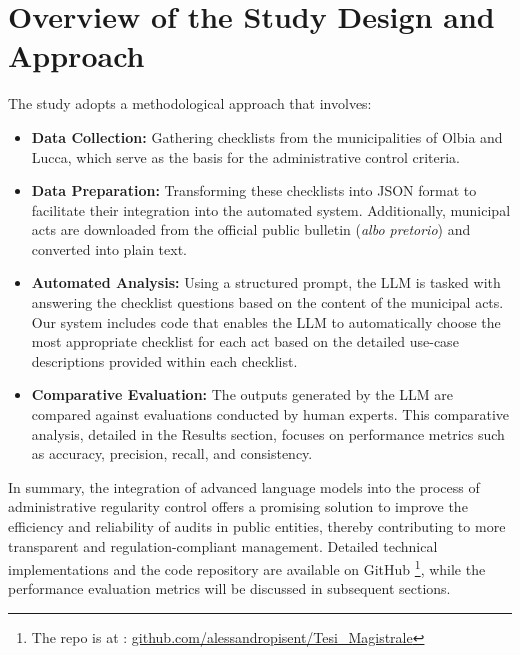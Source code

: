 \documentclass[../main.tex]{subfiles}
\begin{document}
\section*{Overview of the Study Design and Approach}
The study adopts a methodological approach that involves:
\begin{itemize}
    \item \textbf{Data Collection:} Gathering checklists from the municipalities of Olbia and Lucca, which serve as the basis for the administrative control criteria.
    
    \item \textbf{Data Preparation:} Transforming these checklists into JSON format to facilitate their integration into the automated system. Additionally, municipal acts are downloaded from the official public bulletin (\textit{albo pretorio}) and converted into plain text.
    
    \item \textbf{Automated Analysis:} Using a structured prompt, the LLM is tasked with answering the checklist questions based on the content of the municipal acts. Our system includes code that enables the LLM to automatically choose the most appropriate checklist for each act based on the detailed use-case descriptions provided within each checklist.
    
    \item \textbf{Comparative Evaluation:} The outputs generated by the LLM are compared against evaluations conducted by human experts. This comparative analysis, detailed in the Results section, focuses on performance metrics such as accuracy, precision, recall, and consistency.
\end{itemize}

\noindent In summary, the integration of advanced language models into the process of administrative regularity control offers a promising solution to improve the efficiency and reliability of audits in public entities, thereby contributing to more transparent and regulation-compliant management. Detailed technical implementations and the code repository are available on GitHub \footnote{The repo is at   : \href{https://github.com/alessandropisent/Tesi\_Magistrale}{github.com/alessandropisent/Tesi\_Magistrale}}, while the performance evaluation metrics will be discussed in subsequent sections.

\end{document}
